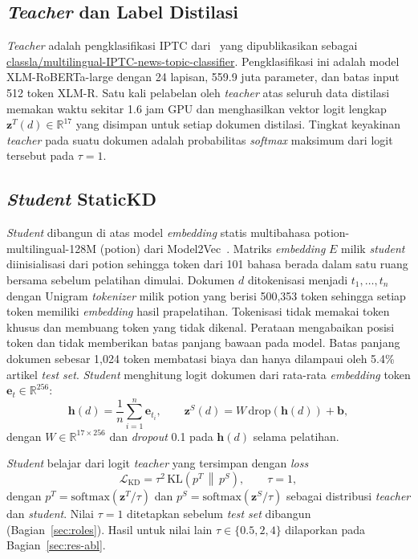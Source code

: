 \documentclass{ieeeaccess}
\newcommand{\en}[1]{\textit{#1}}
\begin{document}
\subsection{\en{Teacher} dan Label Distilasi}
\label{sec:teacher}
\en{Teacher} adalah pengklasifikasi IPTC dari~\cite{kuzman2025llm} yang dipublikasikan sebagai \url{classla/multilingual-IPTC-news-topic-classifier}. Pengklasifikasi ini adalah model XLM-RoBERTa-large dengan 24 lapisan, 559.9 juta parameter, dan batas input 512 token XLM-R. Satu kali pelabelan oleh \en{teacher} atas seluruh data distilasi memakan waktu sekitar 1.6 jam GPU dan menghasilkan vektor logit lengkap $\mathbf{z}^{T}(d)\in\mathbb{R}^{17}$ yang disimpan untuk setiap dokumen distilasi. Tingkat keyakinan \en{teacher} pada suatu dokumen adalah probabilitas \en{softmax} maksimum dari logit tersebut pada $\tau=1$.

\subsection{\en{Student} StaticKD}
\label{sec:student}
\en{Student} dibangun di atas model \en{embedding} statis multibahasa potion-multilingual-128M (potion) dari Model2Vec~\cite{tulkens2024model2vec}. Matriks \en{embedding} $E$ milik \en{student} diinisialisasi dari potion sehingga token dari 101 bahasa berada dalam satu ruang bersama sebelum pelatihan dimulai. Dokumen $d$ ditokenisasi menjadi $t_1,\dots,t_n$ dengan Unigram \en{tokenizer} milik potion yang berisi 500,353 token sehingga setiap token memiliki \en{embedding} hasil prapelatihan. Tokenisasi tidak memakai token khusus dan membuang token yang tidak dikenal. Perataan mengabaikan posisi token dan tidak memberikan batas panjang bawaan pada model. Batas panjang dokumen sebesar 1,024 token membatasi biaya dan hanya dilampaui oleh 5.4\% artikel \en{test set}. \en{Student} menghitung logit dokumen dari rata-rata \en{embedding} token $\mathbf{e}_t\in\mathbb{R}^{256}$:
\begin{equation}
\mathbf{h}(d)=\frac{1}{n}\sum_{i=1}^{n}\mathbf{e}_{t_i},\qquad
\mathbf{z}^{S}(d)=W\,\mathrm{drop}(\mathbf{h}(d))+\mathbf{b},
\label{eq:student}
\end{equation}
dengan $W\in\mathbb{R}^{17\times 256}$ dan \en{dropout} 0.1 pada $\mathbf{h}(d)$ selama pelatihan.

\en{Student} belajar dari logit \en{teacher} yang tersimpan dengan \en{loss}
\begin{equation}
\mathcal{L}_{\mathrm{KD}}=\tau^{2}\,\mathrm{KL}\!\left(p^{T}\,\middle\|\,p^{S}\right),\qquad \tau=1 ,
\label{eq:kd}
\end{equation}
dengan $p^{T}=\mathrm{softmax}(\mathbf{z}^{T}/\tau)$ dan $p^{S}=\mathrm{softmax}(\mathbf{z}^{S}/\tau)$ sebagai distribusi \en{teacher} dan \en{student}. Nilai $\tau=1$ ditetapkan sebelum \en{test set} dibangun (Bagian~\ref{sec:roles}). Hasil untuk nilai lain $\tau\in\{0.5,2,4\}$ dilaporkan pada Bagian~\ref{sec:res-abl}.
\end{document}
